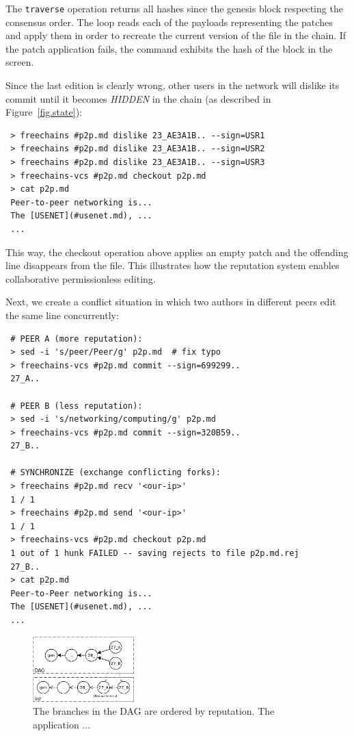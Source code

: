 \documentclass[10pt,journal,compsoc]{IEEEtran}
\begin{document}
The \texttt{traverse} operation returns all hashes since the genesis block
respecting the consensus order.
The loop reads each of the payloads representing the patches and apply them in
order to recreate the current version of the file in the chain.
If the patch application fails, the command exhibits the hash of the block in
the screen.

Since the last edition is clearly wrong, other users in the network will
dislike its commit until it becomes \emph{HIDDEN} in the chain (as described in
Figure~\ref{fig.state}):

{\footnotesize
\begin{verbatim}
 > freechains #p2p.md dislike 23_AE3A1B.. --sign=USR1
 > freechains #p2p.md dislike 23_AE3A1B.. --sign=USR2
 > freechains #p2p.md dislike 23_AE3A1B.. --sign=USR3
 > freechains-vcs #p2p.md checkout p2p.md
 > cat p2p.md
 Peer-to-peer networking is...
 The [USENET](#usenet.md), ...
 ...
\end{verbatim}
}

This way, the checkout operation above applies an empty patch and the offending
line disappears from the file.
This illustrates how the reputation system enables collaborative permissionless
editing.

Next, we create a conflict situation in which two authors in different peers
edit the same line concurrently:

{\footnotesize
\begin{verbatim}
 # PEER A (more reputation):
 > sed -i 's/peer/Peer/g' p2p.md  # fix typo
 > freechains-vcs #p2p.md commit --sign=699299..
 27_A..

 # PEER B (less reputation):
 > sed -i 's/networking/computing/g' p2p.md
 > freechains-vcs #p2p.md commit --sign=320B59..
 27_B..

 # SYNCHRONIZE (exchange conflicting forks):
 > freechains #p2p.md recv '<our-ip>'
 1 / 1
 > freechains #p2p.md send '<our-ip>'
 1 / 1
 > freechains-vcs #p2p.md checkout p2p.md
 1 out of 1 hunk FAILED -- saving rejects to file p2p.md.rej
 27_B..
 > cat p2p.md
 Peer-to-Peer networking is...
 The [USENET](#usenet.md), ...
 ...
\end{verbatim}
}

\begin{figure}
\centering
\includegraphics[width=0.35\textwidth]{conflict.png}
\caption{
    The branches in the DAG are ordered by reputation.
    The application ...
}
\label{fig.conflict}
\end{figure}
\end{document}
